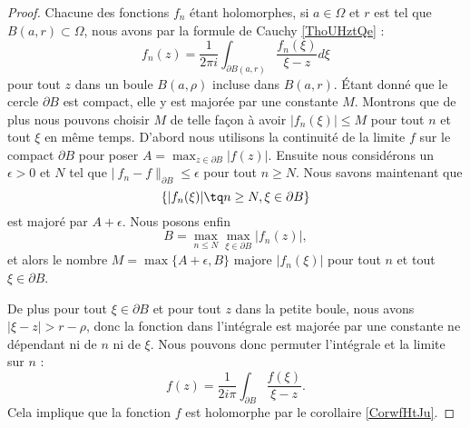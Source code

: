 \begin{proof}
    Chacune des fonctions \( f_n\) étant holomorphes, si \( a\in \Omega\) et \( r\) est tel que \( B(a,r)\subset \Omega\), nous avons par la formule de Cauchy \ref{ThoUHztQe} :
    \begin{equation}
        f_n(z)=\frac{1}{ 2\pi i }\int_{\partial B(a,r)}\frac{ f_n(\xi) }{ \xi-z }d\xi
    \end{equation}
    pour tout \( z\) dans un boule \( B(a,\rho)\) incluse dans \( B(a,r)\). Étant donné que le cercle \( \partial B\) est compact, elle y est majorée par une constante \( M\). Montrons que de plus nous pouvons choisir \( M\) de telle façon à avoir \( | f_n(\xi) |\leq M\) pour tout \( n\) et tout \( \xi\) en même temps. D'abord nous utilisons la continuité de la limite \( f\) sur le compact \( \partial B \) pour poser \( A=\max_{z\in\partial B}| f(z) |\). Ensuite nous considérons un \( \epsilon>0\) et \( N\) tel que \( |\ f_n-f \|_{\partial B}\leq \epsilon\) pour tout \( n\geq N\). Nous savons maintenant que
    \begin{equation}
        \{ | f_n(\xi) |\tq n \geq N,\xi\in\partial B \}
    \end{equation}
    est majoré par \( A+\epsilon\). Nous posons enfin
    \begin{equation}
        B=\max_{n\leq N}\max_{\xi\in\partial B}| f_n(z) |,
    \end{equation}
    et alors le nombre \( M=\max\{ A+\epsilon,B \}\) majore \( | f_n(\xi) |\) pour tout \( n\) et tout \( \xi\in\partial B\).
    
    De plus pour tout \( \xi\in\partial B\) et pour tout \( z\) dans la petite boule, nous avons \( | \xi-z |>r-\rho\), donc  la fonction dans l'intégrale est majorée par une constante ne dépendant ni de \( n\) ni de \( \xi\). Nous pouvons donc permuter l'intégrale et la limite sur \( n\) :
    \begin{equation}
        f(z)=\frac{1}{ 2i\pi }\int_{\partial B}\frac{ f(\xi) }{ \xi-z }.
    \end{equation}
    Cela implique que la fonction \( f\) est holomorphe par le corollaire \ref{CorwfHtJu}.


\end{proof}
